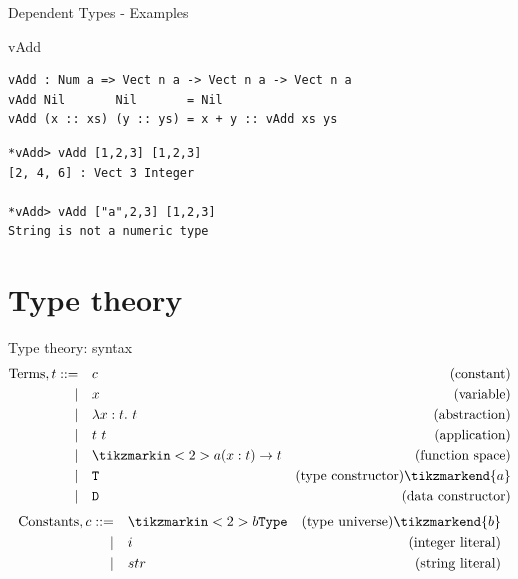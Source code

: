 \documentclass{beamer}
\begin{document}
	\begin{frame}[fragile]{Dependent Types - Examples}
		\begin{block}{vAdd}
			\begin{lstlisting}[basicstyle=\ttfamily\scriptsize]
vAdd : Num a => Vect n a -> Vect n a -> Vect n a
vAdd Nil       Nil       = Nil
vAdd (x :: xs) (y :: ys) = x + y :: vAdd xs ys
			\end{lstlisting}
		\end{block}
		\begin{block}{}
			\begin{lstlisting}[basicstyle=\ttfamily\scriptsize]
*vAdd> vAdd [1,2,3] [1,2,3]
[2, 4, 6] : Vect 3 Integer
				
*vAdd> vAdd ["a",2,3] [1,2,3]
String is not a numeric type
			\end{lstlisting}
		\end{block}
	\end{frame}
	
	\newcommand{\typetheory}{Type theory}
	\section{\typetheory}
	\label{sec:typetheory}
	
	\begin{frame}{\typetheory: syntax}
		\begin{align*}
			\text{Terms}, t ::= \quad & c & \text{(constant)} \\
			| \quad & x & \text{(variable)} \\
			| \quad & \lambda x : t.\ t & \text{(abstraction)} \\
			| \quad & t\ t & \text{(application)} \\
			| \quad & \tikzmarkin<2>{a} {(}x : t) \to t & \text{(function space)}  \\
			| \quad & \texttt{T} & \text{(type constructor)} \tikzmarkend{a} \\
			| \quad & \texttt{D} & \text{(data constructor)} \\
		\end{align*}
		\begin{align*}
			\text{Constants}, c ::= \quad & \tikzmarkin<2>{b} \texttt{Type} & \text{(type universe)} \tikzmarkend{b} \\
			| \quad & i & \text{(integer literal)} \\
			| \quad & str & \text{(string literal)} \\
		\end{align*}
	\end{frame}
	
\end{document}

